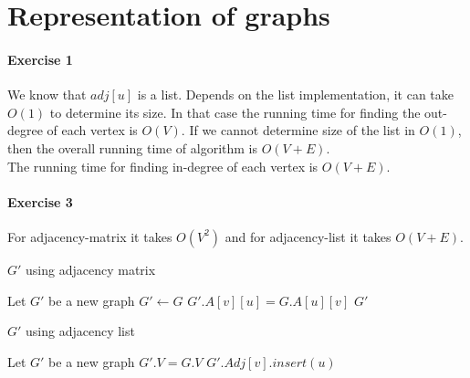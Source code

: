 \documentclass{book}
\begin{document}
	\section{Representation of graphs}
	\label{sec:Representation of graphs}
	\paragraph{Exercise 1}
	We know that $adj[u]$ is a list. Depends on the list implementation, it can take $O(1)$ to determine its size. In that case the running time for finding the out-degree of each vertex is $O(V)$. If we cannot determine size of the list in $O(1)$, then the overall running time of algorithm is $O(V + E)$. \\
	The running time for finding in-degree of each vertex is $O(V + E)$.
	\paragraph{Exercise 3}
	For adjacency-matrix it takes $O(V^2)$ and for adjacency-list it takes $O(V + E)$.
	\begin{algorithm}[h!]
		\caption{$G'$ using adjacency matrix}
		\begin{algorithmic}[1]
				\State Let $G'$ be a new graph
				\State $G' \gets G$
						\State $G'.A[v][u] = G.A[u][v]$
					\EndFor
				\EndFor
				\State \Return $G'$
			\EndFunction
		\end{algorithmic}
	\end{algorithm}
	\begin{algorithm*}[h!]
		\caption{$G'$ using adjacency list}
		\begin{algorithmic}[1]
				\State Let $G'$ be a new graph
				\State $G'.V = G.V$
						\State $G'.Adj[v].insert(u)$
					\EndFor
				\EndFor
			\EndFunction
		\end{algorithmic}
	\end{algorithm*}
	\FloatBarrier
\end{document}
